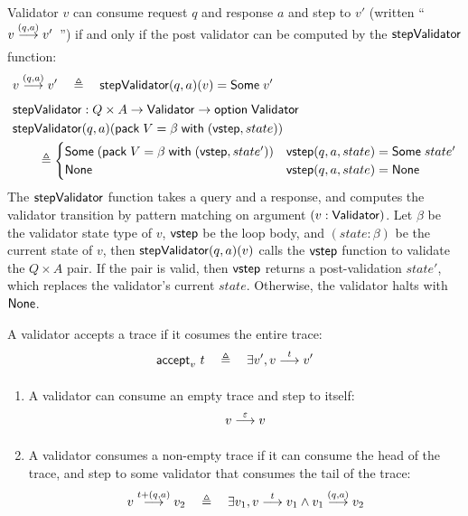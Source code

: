 \begin{definition}
  \label{def:validator-step}
  Validator $v$ can consume request $q$ and response $a$ and step to $v'$
  (written ``$\behaves v{(q,a)}v'$~'') if and only if the post validator can be
  computed by the $\mathsf{stepValidator}$ function:
\begin{align*}
  &\behaves v{(q,a)}v'\quad\triangleq\quad\stepValidator(q,a)(v)=\Some v'\\
  &\stepValidator:Q\times A\to\Validator\to\option\Validator\\
  &\stepValidator(q,a)(\existT{V}{\beta}{(\vstep,state)})\\
  &\qquad\triangleq\begin{cases}
  \Some{(\existT{V}{\beta}{(\vstep,state')})} & \vstep(q,a,state)=\Some{state'} \\
  \None & \vstep(q,a,state)=\None
  \end{cases}
\end{align*}
The $\mathsf{stepValidator}$ function takes a query and a response, and computes the
validator transition by pattern matching on argument $(v:\mathsf{Validator})$.  Let
$\beta$ be the validator state type of $v$, $\mathsf{vstep}$ be the loop body, and
$(state:\beta)$ be the current state of $v$, then $\mathsf{stepValidator}(q,a)(v)$ calls
the $\mathsf{vstep}$ function to validate the $Q\times A$ pair.  If the pair is valid,
then $\mathsf{vstep}$ returns a post-validation $state'$, which replaces the validator's
current $state$.  Otherwise, the validator halts with $\mathsf{None}$.
\end{definition}

\begin{definition}
A validator accepts a trace if it cosumes the entire trace:
\[\accepts v t\quad\triangleq\quad\exists v',\behaves v t v'\]
\begin{enumerate}
\item A validator can consume an empty trace and step to itself:
  \[\behaves v\nil v\]
\item A validator consumes a non-empty trace if it can consume the head of the
  trace, and step to some validator that consumes the tail of the trace:
  \[\behaves v {t+(q,a)} v_2\quad\triangleq\quad\exists v_1,\behaves v t v_1\wedge
  \behaves{v_1}{(q,a)}{v_2}\]
\end{enumerate}
\end{definition}

